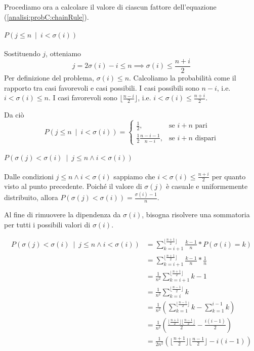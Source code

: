 \documentclass[../../../relazione.tex]{subfiles}
\begin{document}
Procediamo ora a calcolare il valore di ciascun fattore dell'equazione (\ref{analisi:probC:chainRule}).
\paragraph{$P(j \leq n\ \mid\ i < \sigma(i))$}
Sostituendo $j$, otteniamo
\[j = 2\sigma(i) - i \leq n \implies \sigma(i) \leq \frac{n+i}{2}\]
Per definizione del problema, $\sigma(i) \leq n$.
Calcoliamo la probabilità come il rapporto tra casi favorevoli e casi possibili.
I casi possibili sono $n-i$, i.e. $i < \sigma(i) \leq n$.
I casi favorevoli sono $\lfloor \frac{n-i}{2} \rfloor$, i.e. $i < \sigma(i) \leq \frac{n+i}{2}$.

Da ciò
\begin{equation}\label{analisi:probC:chainRule:part1}
  P(j \leq n\ \mid\ i < \sigma(i)) =
  \begin{cases}
    \frac{1}{2},                  & \mbox{se $i+n$ pari}    \\
    \frac{1}{2}\frac{n-i-1}{n-i}, & \mbox{se $i+n$ dispari}
  \end{cases}
\end{equation}

\paragraph{$P(\sigma(j) < \sigma(i)\ \mid\ j \leq n \wedge i < \sigma(i))$}
Dalle condizioni $j \leq n \wedge i < \sigma(i)$ sappiamo che $i < \sigma(i) \leq \frac{n+i}{2}$ per quanto visto al punto precedente.
Poiché il valore di $\sigma(j)$ è casuale e uniformemente distribuito, allora $P(\sigma(j) < \sigma(i)) = \frac{\sigma(i)-1}{n}$.

Al fine di rimuovere la dipendenza da $\sigma(i)$, bisogna risolvere una sommatoria per tutti i possibili valori di $\sigma(i)$.

\begin{equation*}
  \begin{split}
    P(\sigma(j) < \sigma(i)\ \mid\ j \leq n \wedge i < \sigma(i))
    &= \sum_{k = i+1}^{\lfloor \frac{n+1}{2} \rfloor} \frac{k-1}{n} * P(\sigma(i)=k) \\
    &= \sum_{k = i+1}^{\lfloor \frac{n+1}{2} \rfloor} \frac{k-1}{n} * \frac{1}{n} \\
    &= \frac{1}{n^2}\sum_{k = i+1}^{\lfloor \frac{n+1}{2} \rfloor}k-1 \\
    &= \frac{1}{n^2}\sum_{k = i}^{\lfloor \frac{n-1}{2} \rfloor}k \\
    &= \frac{1}{n^2}\left( \sum_{k = 1}^{\lfloor \frac{n-1}{2} \rfloor}k - \sum_{k = 1}^{i-1}k \right) \\
    &= \frac{1}{n^2}\left( \frac{\lfloor \frac{n+1}{2} \rfloor\lfloor \frac{n-1}{2} \rfloor}{2} - \frac{i(i-1)}{2} \right) \\
    &= \frac{1}{2n^2}\left( \lfloor \frac{n+1}{2} \rfloor\lfloor \frac{n-1}{2} \rfloor - i(i-1) \right) \\
  \end{split}
\end{equation*}
\end{document}
